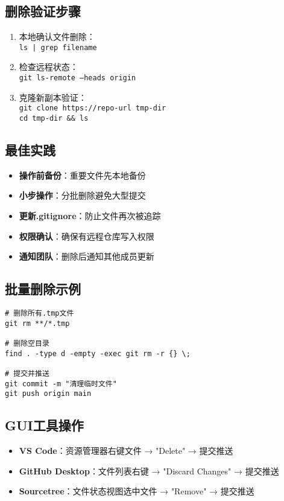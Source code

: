 \subsection{删除验证步骤}
\begin{enumerate}[leftmargin=*, nosep]
    \item 本地确认文件删除：\\
    \texttt{ls | grep filename}
    
    \item 检查远程状态：\\
    \texttt{git ls-remote --heads origin}
    
    \item 克隆新副本验证：\\
    \texttt{git clone https://repo-url tmp-dir} \\
    \texttt{cd tmp-dir \&\& ls}
\end{enumerate}

\subsection{最佳实践}
\begin{itemize}[leftmargin=*, nosep]
    \item \textbf{操作前备份}：重要文件先本地备份
    \item \textbf{小步操作}：分批删除避免大型提交
    \item \textbf{更新.gitignore}：防止文件再次被追踪
    \item \textbf{权限确认}：确保有远程仓库写入权限
    \item \textbf{通知团队}：删除后通知其他成员更新
\end{itemize}

\subsection{批量删除示例}
\begin{verbatim}
# 删除所有.tmp文件
git rm **/*.tmp

# 删除空目录
find . -type d -empty -exec git rm -r {} \;

# 提交并推送
git commit -m "清理临时文件"
git push origin main
\end{verbatim}

\subsection{GUI工具操作}
\begin{itemize}[leftmargin=*, nosep]
    \item \textbf{VS Code}：资源管理器右键文件 → "Delete" → 提交推送
    \item \textbf{GitHub Desktop}：文件列表右键 → "Discard Changes" → 提交推送
    \item \textbf{Sourcetree}：文件状态视图选中文件 → "Remove" → 提交推送
\end{itemize}